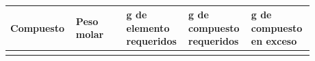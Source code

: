 \begin{table}[H]
\centering
\caption{}
\label{tab:}
\begin{threeparttable}
{
\begin{tabular}{p{0.16\linewidth}p{0.16\linewidth}p{0.185\linewidth}p{0.185\linewidth}p{0.185\linewidth}}\hline

    \textbf{Compuesto} & \textbf{Peso molar} & \textbf{g de elemento requeridos} & \textbf{g de compuesto requeridos} & \textbf{g de compuesto en exceso} \\ \hline
    
     &  &  &  & \\
    
    \hline
\end{tabular}
}
\begin{tablenotes} %
    \item[] 
\end{tablenotes}
\end{threeparttable}
\end{table}